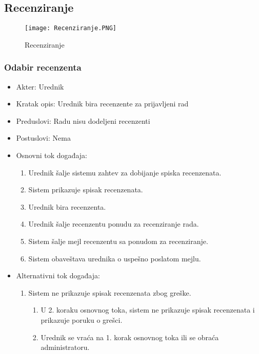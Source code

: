 \documentclass[a4paper]{article}
\begin{document}
\subsection{Recenziranje}

\begin{figure}[hbt!]
    \centering
    \texttt{[image: Recenziranje.PNG]}
    \caption{Recenziranje}
    \label{fig:my_label}
\end{figure}

\subsubsection{Odabir recenzenta}
\begin{itemize}
    \item Akter: Urednik
    \item Kratak opis: Urednik bira recenzente za prijavljeni rad
    \item Preduslovi: Radu nisu dodeljeni recenzenti
    \item Postuslovi: Nema
    \item Osnovni tok događaja:
        \begin{enumerate}
           \item Urednik šalje sistemu zahtev za dobijanje spiska recenzenata.
           \item Sistem prikazuje spisak recenzenata.
           \item Urednik bira recenzenta.
           \item Urednik šalje recenzentu ponudu za recenziranje rada.
           \item Sistem šalje mejl recenzentu sa ponudom za recenziranje.
           \item Sistem obaveštava urednika o uspešno poslatom mejlu.
        \end{enumerate}
    \item Alternativni tok događaja:
        \begin{enumerate}
            \item Sistem ne prikazuje spisak recenzenata zbog greške.
            \begin{enumerate}
                \item U 2. koraku osnovnog toka, sistem ne prikazuje spisak recenzenata i prikazuje poruku o grešci.
                \item Urednik se vraća na 1. korak osnovnog toka ili se obraća administratoru.
            \end{enumerate}

\end{enumerate}
\end{itemize}
\end{document}
